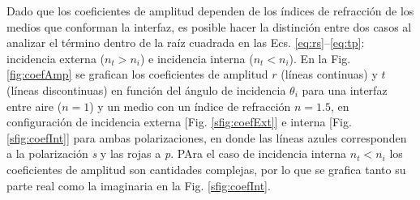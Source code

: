 %
Dado que los coeficientes  de amplitud dependen de los índices de refracción de los medios que conforman la interfaz, es posible hacer la distinción entre dos casos al analizar el término dentro de la raíz cuadrada en las Ecs. \eqref{eq:rs}--\eqref{eq:tp}: incidencia externa ($n_t>n_i$) e incidencia interna ($n_t<n_i$). En la Fig. \ref{fig:coefAmp} se grafican los coeficientes de amplitud $r$ (líneas continuas) y $t$ (líneas discontinuas) en función del ángulo de incidencia $\theta_i$ para una interfaz entre aire ($n= 1$) y un medio con un índice de refracción $n = 1.5$, en configuración de incidencia externa [Fig. \ref{sfig:coefExt}] e interna [Fig. \ref{sfig:coefInt}] para ambas polarizaciones, en donde las líneas azules corresponden a la polarización \emph{s} y las rojas a \emph{p}. PAra el caso de incidencia interna $n_t<n_i$ los coeficientes de amplitud son cantidades complejas, por lo que se grafica tanto su parte real como la imaginaria en la Fig. \ref{sfig:coefInt}.
%
